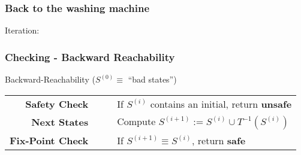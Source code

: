 \begin{frame}
  \frametitle{Back to the washing machine}

Iteration: 
  \vfill
  \begin{center}
  \end{center}

\end{frame}

\begin{frame}
  \frametitle{Checking - Backward Reachability}
  \begin{boxedminipage}{\textwidth}
  \begin{center}
  Backward-Reachability ($S^{(0)} \equiv$ ``bad states'')
  \begin{tabular}{rcl}
     \\
       {\bf Safety Check} & ~~ & If $S^{(i)}$ contains an initial, return {\bf unsafe} \\
        {\bf Next States} & ~~ & Compute $S^{(i+1)} := S^{(i)} \cup T^{-1}(S^{(i)})$ \\
    {\bf Fix-Point Check} & ~~ & If $S^{(i+1)} \equiv S^{(i)}$, return {\bf safe}
  \end{tabular}
  \end{center}
  \end{boxedminipage}
  \vfill
  \begin{overlayarea}{\textwidth}{4cm}
    \only<1|handout:0>{\scalebox{.6}{}}
  \end{overlayarea}

\end{frame}
